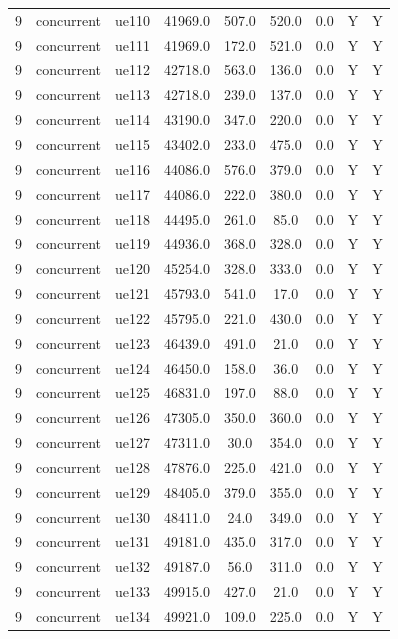 \begin{table}[ht]
\begin{tabular}{|c|c|c|c|c|c|c|c|c|}
9 & concurrent & ue110 & 41969.0 & 507.0 & 520.0 & 0.0 & Y & Y \\
9 & concurrent & ue111 & 41969.0 & 172.0 & 521.0 & 0.0 & Y & Y \\
9 & concurrent & ue112 & 42718.0 & 563.0 & 136.0 & 0.0 & Y & Y \\
9 & concurrent & ue113 & 42718.0 & 239.0 & 137.0 & 0.0 & Y & Y \\
9 & concurrent & ue114 & 43190.0 & 347.0 & 220.0 & 0.0 & Y & Y \\
9 & concurrent & ue115 & 43402.0 & 233.0 & 475.0 & 0.0 & Y & Y \\
9 & concurrent & ue116 & 44086.0 & 576.0 & 379.0 & 0.0 & Y & Y \\
9 & concurrent & ue117 & 44086.0 & 222.0 & 380.0 & 0.0 & Y & Y \\
9 & concurrent & ue118 & 44495.0 & 261.0 & 85.0 & 0.0 & Y & Y \\
9 & concurrent & ue119 & 44936.0 & 368.0 & 328.0 & 0.0 & Y & Y \\
9 & concurrent & ue120 & 45254.0 & 328.0 & 333.0 & 0.0 & Y & Y \\
9 & concurrent & ue121 & 45793.0 & 541.0 & 17.0 & 0.0 & Y & Y \\
9 & concurrent & ue122 & 45795.0 & 221.0 & 430.0 & 0.0 & Y & Y \\
9 & concurrent & ue123 & 46439.0 & 491.0 & 21.0 & 0.0 & Y & Y \\
9 & concurrent & ue124 & 46450.0 & 158.0 & 36.0 & 0.0 & Y & Y \\
9 & concurrent & ue125 & 46831.0 & 197.0 & 88.0 & 0.0 & Y & Y \\
9 & concurrent & ue126 & 47305.0 & 350.0 & 360.0 & 0.0 & Y & Y \\
9 & concurrent & ue127 & 47311.0 & 30.0 & 354.0 & 0.0 & Y & Y \\
9 & concurrent & ue128 & 47876.0 & 225.0 & 421.0 & 0.0 & Y & Y \\
9 & concurrent & ue129 & 48405.0 & 379.0 & 355.0 & 0.0 & Y & Y \\
9 & concurrent & ue130 & 48411.0 & 24.0 & 349.0 & 0.0 & Y & Y \\
9 & concurrent & ue131 & 49181.0 & 435.0 & 317.0 & 0.0 & Y & Y \\
9 & concurrent & ue132 & 49187.0 & 56.0 & 311.0 & 0.0 & Y & Y \\
9 & concurrent & ue133 & 49915.0 & 427.0 & 21.0 & 0.0 & Y & Y \\
9 & concurrent & ue134 & 49921.0 & 109.0 & 225.0 & 0.0 & Y & Y \\

\end{tabular}
\end{table}
